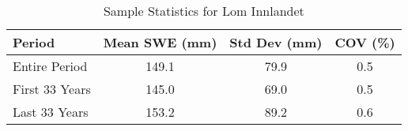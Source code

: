 
    \begin{table}[h!]
        \centering
        \caption{Sample Statistics for Lom Innlandet}
        \begin{tabular}{lccc} 
            \toprule
            \textbf{Period} & \textbf{Mean SWE (mm)} & \textbf{Std Dev (mm)} & \textbf{COV (\%)} \\
            \midrule
            Entire Period & 149.1 & 79.9 & 0.5 \\
            First 33 Years & 145.0 & 69.0 & 0.5 \\
            Last 33 Years & 153.2 & 89.2 & 0.6 \\
            \bottomrule
        \end{tabular}
        \label{tab:sample_stats_Lom Innlandet}
    \end{table}
    